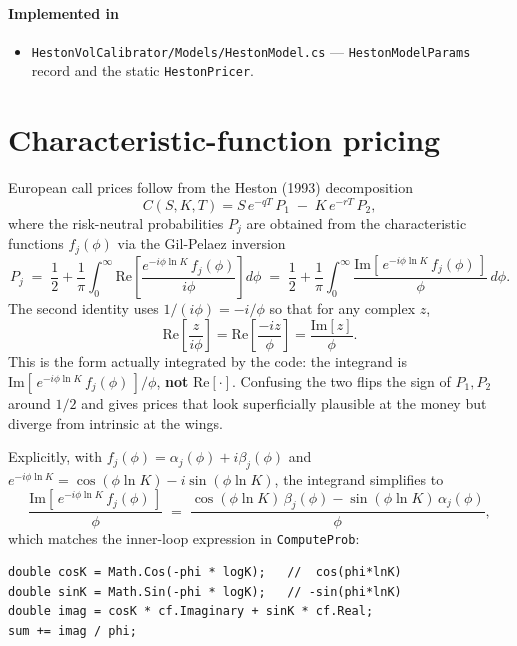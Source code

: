 \documentclass[11pt,a4paper]{article}
\begin{document}
\paragraph*{Implemented in}
\begin{itemize}
\item \texttt{HestonVolCalibrator/Models/HestonModel.cs} --- \texttt{HestonModelParams} record and the static \texttt{HestonPricer}.
\end{itemize}

\section{Characteristic-function pricing}
\label{sec:cf}
European call prices follow from the Heston (1993) decomposition
\[
C(S, K, T) = S\, e^{-q T}\, P_1 \;-\; K\, e^{-r T}\, P_2,
\]
where the risk-neutral probabilities $P_j$ are obtained from the characteristic
functions $f_j(\phi)$ via the Gil-Pelaez inversion
\begin{equation*}
P_j \;=\; \frac12 + \frac{1}{\pi} \int_0^\infty
\mathrm{Re}\!\left[\frac{e^{-i \phi \ln K}\, f_j(\phi)}{i\phi}\right] d\phi
\;=\; \frac12 + \frac{1}{\pi} \int_0^\infty
\frac{\mathrm{Im}\!\left[\, e^{-i \phi \ln K}\, f_j(\phi)\,\right]}{\phi}\, d\phi.
\end{equation*}
The second identity uses $1/(i\phi) = -i/\phi$ so that for any complex $z$,
\[
\mathrm{Re}\!\left[\frac{z}{i\phi}\right] = \mathrm{Re}\!\left[\frac{-i z}{\phi}\right]
= \frac{\mathrm{Im}[z]}{\phi}.
\]
This is the form actually integrated by the code: the integrand is
$\mathrm{Im}[\,e^{-i\phi \ln K}\, f_j(\phi)\,]/\phi$, \textbf{not} $\mathrm{Re}[\cdot]$.
Confusing the two flips the sign of $P_1, P_2$ around $1/2$ and gives prices that
look superficially plausible at the money but diverge from intrinsic at the wings.

Explicitly, with $f_j(\phi) = \alpha_j(\phi) + i\beta_j(\phi)$ and
$e^{-i\phi \ln K} = \cos(\phi \ln K) - i\sin(\phi \ln K)$, the integrand simplifies to
\[
\frac{\mathrm{Im}[\,e^{-i\phi \ln K}\, f_j(\phi)\,]}{\phi}
\;=\;
\frac{\cos(\phi \ln K)\,\beta_j(\phi) - \sin(\phi \ln K)\,\alpha_j(\phi)}{\phi},
\]
which matches the inner-loop expression in \texttt{ComputeProb}:
\begin{lstlisting}
double cosK = Math.Cos(-phi * logK);   //  cos(phi*lnK)
double sinK = Math.Sin(-phi * logK);   // -sin(phi*lnK)
double imag = cosK * cf.Imaginary + sinK * cf.Real;
sum += imag / phi;
\end{lstlisting}
\end{document}
